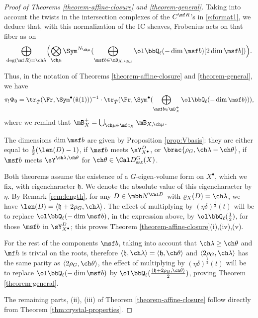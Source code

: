 \begin{proof}[Proof of Theorems \ref{theorem-affine-closure} and \ref{theorem-general}]
Taking into account the twists in the intersection complexes of the $C^{\mf R}$'s in \eqref{e:format1}, we deduce that, with this normalization of the IC sheaves, Frobenius acts on that fiber as on
\[
\bigoplus_{\deg(\mf R)=\ch\lambda}
\Bigl( \bigotimes_{\ch\mu}
\Sym^{N_{\ch\mu}}(\bigoplus_{\msf b\in \mB_{X,\ch\mu}} \ol\bbQ_\ell(-\dim \msf b)[2\dim \msf b] )\Bigr).
\]

Thus, in the notation of Theorems \ref{theorem-affine-closure} and \ref{theorem-general}, we have
\[\pi_! \Phi_0 = \tr_{\check T}(\Fr, \Sym^\bullet (\check{\mathfrak n}(1)))^{-1} \cdot \tr_{\check T}(\Fr, \Sym^\bullet (\bigoplus_{\msf b\in \mB_X^+} \ol\bbQ_\ell(-\dim \msf b))),\]
where we remind that $\mB_X^+ = \bigcup_{\ch\mu\in \mf c_X} \mB_{X,\ch\mu}$.

The dimensions $\dim \msf b$ are given by Proposition \ref{prop:Vbasis}:
they are either equal to $\frac 1 2(\len(D)-1)$, if $\msf b$ meets $\sY_{X^\bullet}^{D}$, or $\brac{\rho_G,\ch\lambda-\ch\theta}$, if $\msf b$ meets $\sY^{\ch\lambda,\ch\theta}$ for $\ch\theta \in \Cal D^G_{\mathrm{sat}}(X)$.

Both theorems assume the existence of a $G$-eigen-volume form on $X^\bullet$, which we fix, with eigencharacter $\mathfrak h$. We denote the absolute value of this eigencharacter by $\eta$. By Remark \ref{rem:length}, for any $D\in \mbb N^{\Cal D}$ with $\varrho_X(D)=\ch\lambda$, we have $ \len (D) = \left< \mathfrak h + 2\rho_G, \ch\lambda\right>$. The effect of multiplying by $  (\eta\delta)^\frac{1}{2}(t)$ will be to replace $\ol\bbQ_\ell(-\dim \msf b)$, in the expression above, by $\ol\bbQ_\ell(\frac{1}{2})$, for those $\msf b$ in $\sY_{X^\bullet}^{D}$; this proves Theorem \ref{theorem-affine-closure}(i),(iv),(v).

For the rest of the components $\msf b$, taking into account that $\ch\lambda\ge \ch\theta$ and $\mf h$ is trivial on the roots, therefore $\left<\mathfrak h ,\ch\lambda \right> = \left<\mathfrak h, \ch\theta\right>$ and $\left< 2\rho_G, \ch\lambda\right>$ has the same parity as $\left<  2\rho_G, \ch\theta\right>$, the effect of multiplying by $  (\eta\delta)^\frac{1}{2}(t)$ will be to replace $\ol\bbQ_\ell(-\dim \msf b)$ by $\ol\bbQ_\ell(\frac{\left<\mathfrak h + 2\rho_G,\ch\theta\right>}{2})$, proving Theorem \ref{theorem-general}.

The remaining parts, (ii), (iii) of Theorem \ref{theorem-affine-closure} follow directly from Theorem \ref{thm:crystal-properties}.
\end{proof}




